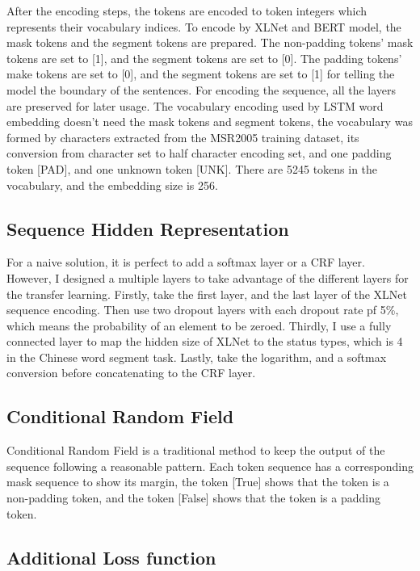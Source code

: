 \documentclass[11pt,a4paper]{article}
\begin{document}
After the encoding steps, the tokens are encoded to token integers which represents their vocabulary indices.
To encode by XLNet and BERT model, the mask tokens and the segment tokens are prepared.
The non-padding tokens' mask tokens are set to [1], and the segment tokens are set to [0].
The padding tokens' make tokens are set to [0], and the segment tokens are set to [1] for telling the model the boundary of the sentences.
For encoding the sequence, all the layers are preserved for later usage.
The vocabulary encoding used by LSTM word embedding doesn't need the mask tokens and segment tokens, the vocabulary was formed by characters extracted from the MSR2005 training dataset, its conversion from character set to half character encoding set,
and one padding token [PAD], and one unknown token [UNK]. There are 5245 tokens in the vocabulary, and the embedding size is 256.

\subsection{Sequence Hidden Representation}

For a naive solution, it is perfect to add a softmax layer or a CRF layer.
However, I designed a multiple layers to take advantage of the different layers for the transfer learning.
Firstly, take the first layer, and the last layer of the XLNet sequence encoding.
Then use two dropout layers with each dropout rate pf 5\%, which means the probability of an element to be zeroed.
Thirdly, I use a fully connected layer to map the hidden size of XLNet to the status types, which is 4 in the Chinese word segment task.
Lastly, take the logarithm, and a softmax conversion before concatenating to the CRF layer.


\subsection{Conditional Random Field}

Conditional Random Field is a traditional method to keep the output of the sequence following a reasonable pattern.
Each token sequence has a corresponding mask sequence to show its margin, the token [True] shows that the token is a non-padding token,
and the token [False] shows that the token is a padding token.

\subsection{Additional Loss function}
\end{document}
